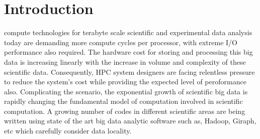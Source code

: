\documentclass[journal]{IEEEtran}
\begin{document}
%
\IEEEpeerreviewmaketitle



\section{Introduction}
% 
% 
% 
% 

 

 compute technologies for terabyte scale scientific and experimental data analysis today are demanding more compute cycles per processor, with extreme I/O performance also required. The hardware cost for storing and processing this big data is increasing linearly with the increase in volume and complexity of these scientific data. Consequently, HPC system designers are facing relentless pressure to reduce the system's cost while providing the expected level of peroformance also. Complicating the scenario, the exponential growth of scientific big data is rapidly changing the fundamental model of computation involved in scientific computation. A growing number of codes in different scientific areas are being written using state of the art big data analytic software such as, Hadoop, Giraph, etc which carefully consider data locality.
\end{document}
